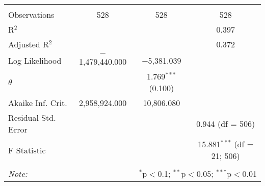 \begin{table}[!htbp]
\begin{tabular}{@{\extracolsep{5pt}}lccc}
 \hline \\[-1.8ex] 
Observations & 528 & 528 & 528 \\ 
R$^{2}$ &  &  & 0.397 \\ 
Adjusted R$^{2}$ &  &  & 0.372 \\ 
Log Likelihood & $-$1,479,440.000 & $-$5,381.039 &  \\ 
$\theta$ &  & 1.769$^{***}$  (0.100) &  \\ 
Akaike Inf. Crit. & 2,958,924.000 & 10,806.080 &  \\ 
Residual Std. Error &  &  & 0.944 (df = 506) \\ 
F Statistic &  &  & 15.881$^{***}$ (df = 21; 506) \\ 
\hline 
\hline \\[-1.8ex] 
\textit{Note:}  & \multicolumn{3}{r}{$^{*}$p$<$0.1; $^{**}$p$<$0.05; $^{***}$p$<$0.01} \\ 
\end{tabular} 
\end{table} 
